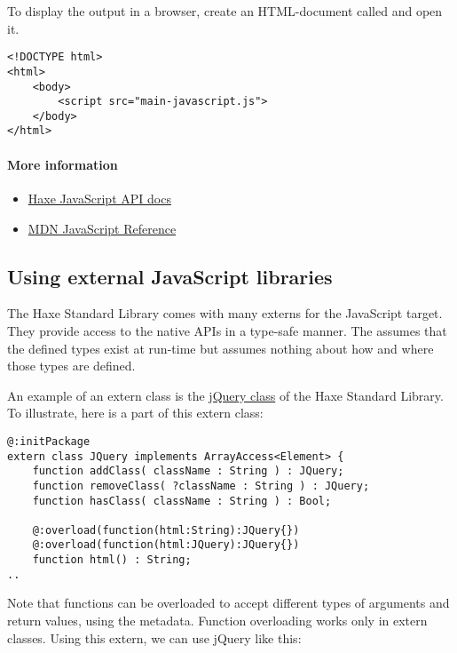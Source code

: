 To display the output in a browser, create an HTML-document called  and open it.

\begin{lstlisting}
<!DOCTYPE html>
<html>
	<body>
		<script src="main-javascript.js">
	</body>
</html>
\end{lstlisting}

\paragraph{More information}

\begin{itemize}
	\item \href{http://api.haxe.org/js/}{Haxe JavaScript API docs}
	\item \href{https://developer.mozilla.org/en-US/docs/Web/JavaScript/Reference}{MDN JavaScript Reference}
\end{itemize}

\subsection{Using external JavaScript libraries}
\label{target-javascript-external-libraries}

The Haxe Standard Library comes with many externs for the JavaScript target. They provide access to the native APIs in a type-safe manner.
The  assumes that the defined types exist at run-time but assumes nothing about how and where those types are defined. 

An example of an extern class is the \href{https://github.com/HaxeFoundation/haxe/blob/development/std/js/JQuery.hx#L83}{jQuery class} of the Haxe Standard Library. 
To illustrate, here is a part of this extern class:

\begin{lstlisting}
@:initPackage
extern class JQuery implements ArrayAccess<Element> {
	function addClass( className : String ) : JQuery;
	function removeClass( ?className : String ) : JQuery;
	function hasClass( className : String ) : Bool;
	
	@:overload(function(html:String):JQuery{})
	@:overload(function(html:JQuery):JQuery{})
	function html() : String;
..
\end{lstlisting}

Note that functions can be overloaded to accept different types of arguments and return values, using the  metadata. Function overloading works only in extern classes.
Using this extern, we can use jQuery like this:

